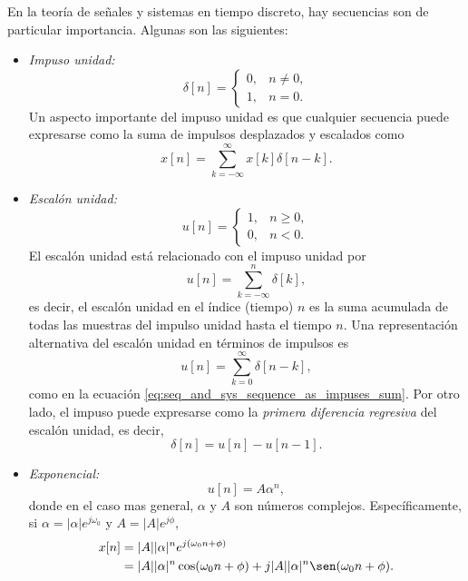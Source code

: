 \documentclass[a4paper]{report}
\begin{document}
En la teoría de señales y sistemas en tiempo discreto, hay secuencias son de particular importancia. Algunas son las siguientes:
\begin{itemize}
 \item \emph{Impuso unidad:}
 \begin{equation}\label{eq:seq_and_sys_unit_sample}
  \delta[n]=
  \left\{
  \begin{array}{rr}
   0, & n\neq0,\\
   1, & n=0.
  \end{array}
  \right.  
 \end{equation}
 Un aspecto importante del impuso unidad es que cualquier secuencia puede expresarse como la suma de impulsos desplazados y escalados como
 \begin{equation}\label{eq:seq_and_sys_sequence_as_impuses_sum}
  x[n]=\sum_{k=-\infty}^\infty x[k]\delta[n-k].  
 \end{equation}
 \item\emph{Escalón unidad:}
  \begin{equation}\label{eq:seq_and_sys_unit_step}
  u[n]=
  \left\{
  \begin{array}{rr}
   1, & n\geq0,\\
   0, & n<0.
  \end{array}
  \right.  
 \end{equation}
 El escalón unidad está relacionado con el impuso unidad por
 \[
  u[n]=\sum_{k=-\infty}^n\delta[k],
 \]
 es decir, el escalón unidad en el índice (tiempo) \(n\) es la suma acumulada de todas las muestras del impulso unidad hasta el tiempo \(n\). Una representación alternativa del escalón unidad en términos de impulsos es 
 \[
  u[n]=\sum_{k=0}^\infty\delta[n-k],
 \]
 como en la ecuación \ref{eq:seq_and_sys_sequence_as_impuses_sum}. Por otro lado, el impuso puede expresarse como  la \emph{primera diferencia regresiva} del escalón unidad, es decir,
 \[
  \delta[n]=u[n]-u[n-1].
 \]
 \item\emph{Exponencial:}
 \begin{equation}\label{eq:seq_and_sys_exponential}
  u[n]=A\alpha^n,
 \end{equation}
 donde en el caso mas general, \(\alpha\) y \(A\) son números complejos. Específicamente, si \(\alpha=|\alpha|e^{j\omega_0}\) y \(A=|A|e^{j\phi}\),
 \begin{align*}
  x[n]&=|A||\alpha|^ne^{j(\omega_0n+\phi)}\\
   &=|A||\alpha|^n\cos(\omega_0n+\phi)+j|A||\alpha|^n\sen(\omega_0n+\phi).  
 \end{align*}
 

\end{itemize}
\end{document}
